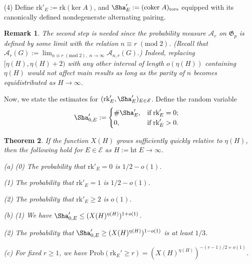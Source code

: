 \documentclass[12pt,reqno]{amsart}
\newtheorem{thm}{Theorem}[section]
\newtheorem{remark}[thm]{Remark}
\numberwithin{equation}{section}
\def\sE{{\mathscr E}}
\def\sG{{\mathfrak G}}
\begin{document}
(4) Define $\text{rk}'_E:= \text{rk}(\text{ker} \; A)$, and $\Sha_E':= (\text{coker} \; A)_{\text{tors}}$ equipped with its canonically defined nondegenerate alternating pairing.


\begin{remark}
{\rm The second step is needed since the probability measure $\mathscr{A}_r$ on $\sG_p$ is defined by some limit with the relation $n \equiv r \; (\text{mod} \; 2)$. (Recall that $\mathscr{A}_r(G):= \lim_{n \equiv r \; (\text{mod} \; 2), \; n \to \infty} \mathscr{A}_{n,r}(G)$.)
Indeed, replacing $[\eta(H), \eta(H)+2)$ with any other interval of length $o(\eta(H))$ containing $\eta(H)$ would not affect main results as long as the parity of $n$ becomes equidistributed as $H \to \infty$.
}
\end{remark}


Now, we state the estimates for $(\text{rk}'_E, \Sha'_E)_{E \in \sE}$. Define the random variable
\begin{align*}
\Sha'_{0,E}:= \begin{cases}
\# \Sha'_E, & \mbox{if} \; \text{rk}'_E = 0; \\
0, & \mbox{if} \; \text{rk}'_E > 0.
\end{cases}
\end{align*}

\begin{thm}\label{t:main1}
If the function $X(H)$ grows sufficiently quickly relative to $\eta(H)$, then the following hold for $E \in \sE$ as $H:= \text{ht} \; E \to \infty$.

\smallskip

\noindent(a) (0) The probability that $\text{rk}'_E = 0$ is $1/2-o(1)$.

\indent \; (1) The probability that $\text{rk}'_E = 1$ is $1/2-o(1)$.

\indent \; (2) The probability that $\text{rk}'_E \ge 2$ is $o(1)$.

\noindent(b) (1) We have $\Sha_{0,E}' \le (X(H)^{\eta(H)})^{1+o(1)}$.

\indent\; (2) The probability that $\Sha_{0,E}' \ge (X(H)^{\eta(H)})^{1-o(1)}$ is at least $1/3$.

\noindent(c) For fixed $r \ge 1$, we have $\text{Prob}(\text{rk}_E' \ge r) = (X(H)^{\eta(H)})^{-(r-1)/2 + o(1)}$. 
\end{thm}
\end{document}
